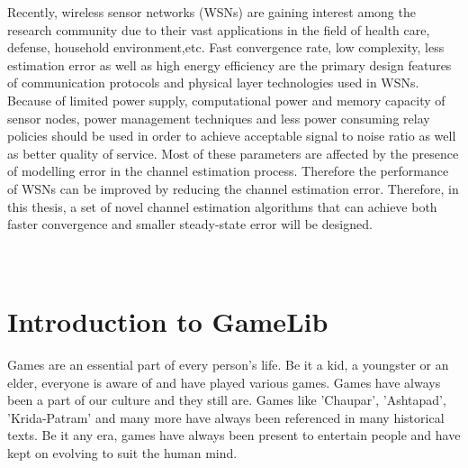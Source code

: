 \documentclass[12pt]{article}
\begin{document}
		Recently, wireless sensor networks (WSNs) are gaining interest among the research community due to their vast applications in the field of health care, defense, household environment,etc. Fast convergence rate, low complexity, less estimation error as well as high energy efficiency are the primary design features of communication protocols and physical layer technologies used in WSNs. Because of limited power supply, computational power and memory capacity of sensor nodes, power management techniques and less power consuming relay policies should be used in order to achieve acceptable signal to noise ratio as well as better quality of service. Most of these parameters are affected by the presence of modelling error in the channel estimation process. Therefore the performance of WSNs can be improved by reducing the channel estimation error. Therefore, in this thesis, a set of
		novel channel estimation algorithms that can achieve both faster convergence and smaller steady-state error will be designed.  \\
		\\
		\\
		
		
		\clearpage
		\fi
		
		\tableofcontents
		\clearpage
		\section{Introduction to GameLib}
		\setlength{\parindent}{10ex}
		Games are an essential part of every person's life. Be it a kid, a youngster or an elder, everyone is aware of and have played various games. Games have always been a part of our culture and they still are. Games like 'Chaupar', 'Ashtapad', 'Krida-Patram' and many more have always been referenced in many historical texts. Be it any era, games have always been present to entertain people and have kept on evolving to suit the human mind.
\end{document}
